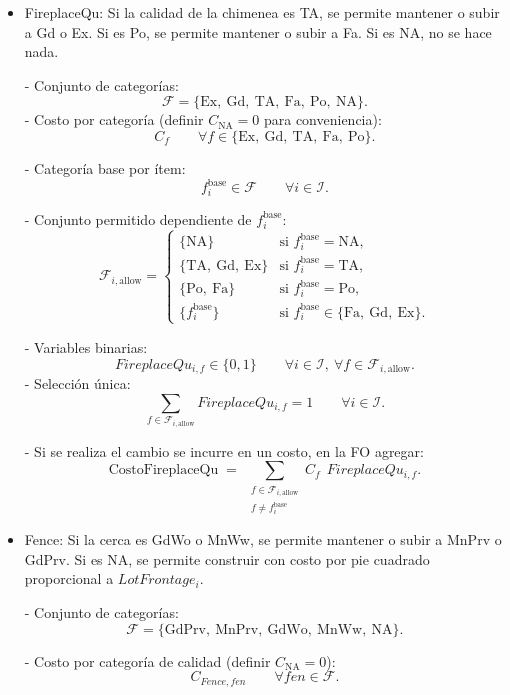 \begin{itemize}
    \item FireplaceQu: Si la calidad de la chimenea es TA, se permite mantener o subir a Gd o Ex. Si es Po, se permite mantener o subir a Fa. Si es NA, no se hace nada.

- Conjunto de categorías:
\[
  \mathcal{F}=\{\text{Ex},\ \text{Gd},\ \text{TA},\ \text{Fa},\ \text{Po},\ \text{NA}\}.
\]
- Costo por categoría (definir $C_{\text{NA}}=0$ para conveniencia):
\[
  C_f \qquad \forall f \in \{\text{Ex},\ \text{Gd},\ \text{TA},\ \text{Fa},\ \text{Po}\}.
\]

- Categoría base por ítem:
\[
  f_i^{\text{base}} \in \mathcal{F} \qquad \forall i \in \mathcal{I}.
\]

- Conjunto permitido dependiente de $f_i^{\text{base}}$:
\[
  \mathcal{F}_{i,\text{allow}} =
  \begin{cases}
    \{\text{NA}\} & \text{si } f_i^{\text{base}}=\text{NA},\\[4pt]
    \{\text{TA},\ \text{Gd},\ \text{Ex}\} & \text{si } f_i^{\text{base}}=\text{TA},\\[4pt]
    \{\text{Po},\ \text{Fa}\} & \text{si } f_i^{\text{base}}=\text{Po},\\[4pt]
    \{f_i^{\text{base}}\} & \text{si } f_i^{\text{base}}\in\{\text{Fa},\ \text{Gd},\ \text{Ex}\}.
  \end{cases}
\]

- Variables binarias:
\[
  FireplaceQu_{i,f} \in \{0,1\} \qquad \forall i \in \mathcal{I},\ \forall f \in \mathcal{F}_{i,\text{allow}}.
\]
- Selección única:
\[
  \sum_{f \in \mathcal{F}_{i,\text{allow}}} FireplaceQu_{i,f} = 1 \qquad \forall i \in \mathcal{I}.
\]

- Si se realiza el cambio se incurre en un costo, en la FO agregar:
\[
  \text{CostoFireplaceQu}
  \;=\;
  \sum_{\substack{f \in \mathcal{F}_{i,\text{allow}} \\ f \neq f_i^{\text{base}}}}
  C_f \;\, FireplaceQu_{i,f}.
\]

    \item Fence: Si la cerca es GdWo o MnWw, se permite mantener o subir a MnPrv o GdPrv. Si es NA, se permite construir con costo por pie cuadrado proporcional a $LotFrontage_i$. 

- Conjunto de categorías:
\[
  \mathcal{F}=\{\text{GdPrv},\ \text{MnPrv},\ \text{GdWo},\ \text{MnWw},\ \text{NA}\}.
\]

- Costo por categoría de calidad (definir $C_{\text{NA}}=0$):
\[
  C_{Fence, fen} \qquad \forall fen \in \mathcal{F}.
\]


\end{itemize}
